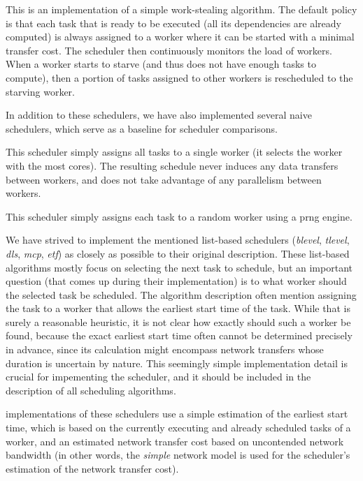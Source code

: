 \begin{description}[wide=0pt]
	\item[ws]
	This is an implementation of a simple work-stealing algorithm. The default policy is that each task
	that is ready to be executed (all its dependencies are already computed) is always assigned to a
	worker where it can be started with a minimal transfer cost. The scheduler then continuously
	monitors the load of workers. When a worker starts to starve (and thus does not have enough tasks
	to compute), then a portion of tasks assigned to other workers is rescheduled to the starving
	worker.
\end{description}

In addition to these schedulers, we have also implemented several naive schedulers, which serve as
a baseline for scheduler comparisons.

\begin{description}[wide=0pt]
	\item[single]
	This scheduler simply assigns all tasks to a single worker (it selects the worker with the most
	cores). The resulting schedule never induces any data transfers between workers, and does not take
	advantage of any parallelism between workers.
	\item[random]
	This scheduler simply assigns each task to a random worker using a \gls{prng} engine.
\end{description}

We have strived to implement the mentioned list-based schedulers (\emph{blevel},
\emph{tlevel}, \emph{dls}, \emph{mcp}, \emph{etf})
as closely as possible to their original description. These list-based algorithms mostly focus on
selecting the next task to schedule, but an important question (that comes up during their
implementation) is to what worker should the selected task be scheduled. The algorithm description
often mention assigning the task to a worker that allows the earliest start time of the task. While
that is surely a reasonable heuristic, it is not clear how exactly should such a worker be found,
because the exact earliest start time often cannot be determined precisely in advance, since its
calculation might encompass network transfers whose duration is uncertain by nature. This seemingly
simple implementation detail is crucial for impementing the scheduler, and it should be included in
the description of all scheduling algorithms.

\estee{} implementations of these schedulers use a simple estimation of the earliest
start time, which is based on the currently executing and already scheduled tasks of a worker, and
an estimated network transfer cost based on uncontended network bandwidth (in other words, the
\emph{simple} network model is used for the scheduler's estimation of the network
transfer cost).

